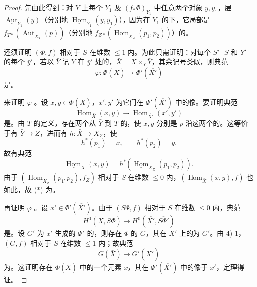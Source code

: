 \begin{proof}
先由此得到：对 $Y$ 上每个 $Y_1$ 及 $(f_*\Phi)_{Y_1}$ 中任意两个对象 $y,y_1$，层 $\underline{\operatorname{Aut}}_{Y_1}(y)$（分别地 $\underline{\operatorname{Hom}}_{Y_1}(y,y_1)$），因为在 $Y_1$ 的下，它局部是 $f_{T*}(\underline{\operatorname{Aut}}_{X_T}(p))$（分别地 $f_{Z*}(\underline{\operatorname{Hom}}_{X_Z}(p_1,p_2))$）的。

还须证明 $(\Phi,f)$ 相对于 $S$ 在维数 $\leq1$ 内。为此只需证明：对每个 $S'$- $S$ 和 $Y'$ 的每个 $\bar y'$，若以 $\bar Y$ 记 $Y$ 在 $\bar y'$ 处的，$\bar X=X\times_Y\bar Y$，其余记号类似，则典范
\[\bar\varphi:\Phi(\bar X)\longrightarrow\Phi'(\overline{X'})\]
是。

来证明 $\bar\varphi$ 。设 $x,y\in\Phi(\bar X)$，$x',y'$ 为它们在 $\Phi'(\overline{X'})$ 中的像。要证明典范
\[
\operatorname{Hom}_{\bar X}(x,y)\longrightarrow
\operatorname{Hom}_{\overline{X'}}(x',y')\tag{*}
\]
是。由 $T$ 的定义，存在两个从 $\bar Y$ 到 $T$ 的，使 $x,y$ 分别是 $p$ 沿这两个的。这等价于有 $\bar Y\to Z$，进而有 $h:\bar X\to X_Z$，使
\[h^*(p_1)=x,\qquad h^*(p_2)=y.\]
故有典范
\[\underline{\operatorname{Hom}}_{\bar X}(x,y)=h^*(\underline{\operatorname{Hom}}_{X_Z}(p_1,p_2)).\]
由于 $(\underline{\operatorname{Hom}}_{X_Z}(p_1,p_2),f_Z)$ 相对于 $S$ 在维数 $\leq0$ 内，$(\underline{\operatorname{Hom}}_{\bar X}(x,y),\bar f)$ 也如此，故 (*) 为。

再证明 $\bar\varphi$ 。设 $x'\in\Phi'(\overline{X'})$。由于 $(S\Phi,f)$ 相对于 $S$ 在维数 $\leq0$ 内，典范
\[H^0(\bar X,\overline{S\Phi})\longrightarrow H^0(\overline{X'},\overline{S\Phi'})\]
是。设 $G'$ 为 $x'$ 生成的 $\Phi'$ 的，则存在 $\Phi$ 的 $G$，其在 $\overline{X'}$ 上的为 $G'$。由 4) 1，$(G,f)$ 相对于 $S$ 在维数 $\leq1$ 内；故典范
\[G(\bar X)\longrightarrow G'(\overline{X'})\]
为。这证明存在 $\Phi(\bar X)$ 中的一个元素 $x$，其在 $\Phi'(\overline{X'})$ 中的像于 $x'$，定理得证。
\end{proof}

